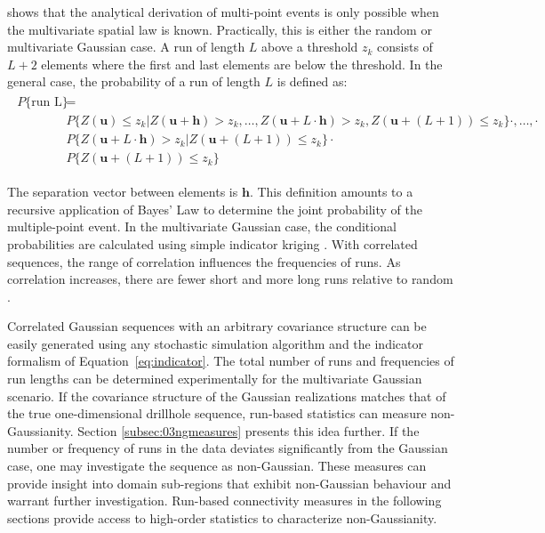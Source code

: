 \cite{ortiz2003characterization} shows that the analytical derivation of multi-point events is only possible when the multivariate spatial law is known. Practically, this is either the random or multivariate Gaussian case. A run of length $L$ above a threshold $z_{k}$ consists of $L+2$ elements where the first and last elements are below the threshold. In the general case, the probability of a run of length $L$ is defined as:
\begin{align}
    \begin{split}
        P\{\text{run L}\} & =                                                                                                                                                                \\
                          & P\{Z(\mathbf{u}) \leq z_{k}| Z(\mathbf{u + h}) > z_{k},\dots, Z(\mathbf{u} + L \cdot \mathbf{h}) > z_{k}, Z(\mathbf{u} + (L+1)) \leq z_{k}\} \cdot ,\dots, \cdot \\
                          & P\{Z(\mathbf{u} + L \cdot \mathbf{h}) > z_{k} | Z(\mathbf{u} + (L+1)) \leq z_{k}\} \cdot                                                                         \\
                          & P\{Z(\mathbf{u} + (L+1)) \leq z_{k}\}
    \end{split}
\end{align}

The separation vector between elements is $\mathbf{h}$. This definition amounts to a recursive application of Bayes' Law to determine the joint probability of the multiple-point event. In the multivariate Gaussian case, the conditional probabilities are calculated using simple indicator kriging \citep{journel1989nongaussian}. With correlated sequences, the range of correlation influences the frequencies of runs. As correlation increases, there are fewer short and more long runs relative to random \citep{ortiz2003characterization}.

Correlated Gaussian sequences with an arbitrary covariance structure can be easily generated using any stochastic simulation algorithm and the indicator formalism of Equation~\ref{eq:indicator}. The total number of runs and frequencies of run lengths can be determined experimentally for the multivariate Gaussian scenario. If the covariance structure of the Gaussian realizations matches that of the true one-dimensional drillhole sequence, run-based statistics can measure non-Gaussianity. Section \ref{subsec:03ngmeasures} presents this idea further. If the number or frequency of runs in the data deviates significantly from the Gaussian case, one may investigate the sequence as non-Gaussian. These measures can provide insight into domain sub-regions that exhibit non-Gaussian behaviour and warrant further investigation. Run-based connectivity measures in the following sections provide access to high-order statistics to characterize non-Gaussianity.

